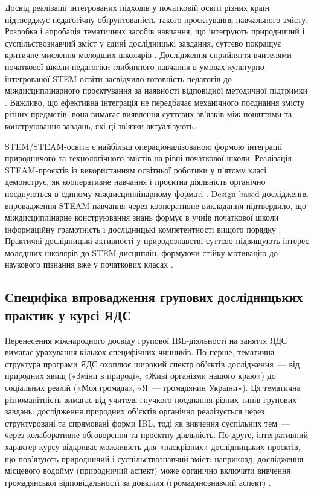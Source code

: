 \documentclass[a4paper,14pt]{extarticle}
\begin{document}
Досвід реалізації інтегрованих підходів у початковій освіті різних країн підтверджує педагогічну обґрунтованість такого проєктування навчального змісту. Розробка і апробація тематичних засобів навчання, що інтегрують природничий і суспільствознавчий зміст у єдині дослідницькі завдання, суттєво покращує критичне мислення молодших школярів \parencite{Sururuddin2026}. Дослідження сприйняття вчителями початкової школи педагогіки глибинного навчання в умовах культурно-інтегрованої STEM-освіти засвідчило готовність педагогів до міждисциплінарного проєктування за наявності відповідної методичної підтримки \parencite{Putri20251331}. Важливо, що ефективна інтеграція не передбачає механічного поєднання змісту різних предметів: вона вимагає виявлення суттєвих зв'язків між поняттями та конструювання завдань, які ці зв'язки актуалізують.

STEM/STEAM-освіта є найбільш операціоналізованою формою інтеграції природничого та технологічного змістів на рівні початкової школи. Реалізація STEAM-проєктів із використанням освітньої роботики у п'ятому класі демонструє, як кооперативне навчання і проєктна діяльність органічно поєднуються в єдиному міждисциплінарному форматі \parencite{Vicente20201}. Design-based дослідження впровадження STEAM-навчання через кооперативне викладання підтвердило, що міждисциплінарне конструювання знань формує в учнів початкової школи інформаційну грамотність і дослідницькі компетентності вищого порядку \parencite{Li2022}. Практичні дослідницькі активності у природознавстві суттєво підвищують інтерес молодших школярів до STEM-дисциплін, формуючи стійку мотивацію до наукового пізнання вже у початкових класах \parencite{Ribarić2025}.

\subsection{Специфіка впровадження групових дослідницьких практик у курсі ЯДС}

Перенесення міжнародного досвіду групової IBL-діяльності на заняття ЯДС вимагає урахування кількох специфічних чинників. По-перше, тематична структура програми ЯДС охоплює широкий спектр об'єктів дослідження~--- від природних явищ («Зміни в природі», «Живі організми нашого краю») до соціальних реалій («Моя громада», «Я~--- громадянин України»). Ця тематична різноманітність вимагає від учителя гнучкого поєднання різних типів групових завдань: дослідження природних об'єктів органічно реалізується через структуровані та спрямовані форми IBL, тоді як вивчення суспільних тем~--- через колаборативне обговорення та проєктну діяльність. По-друге, інтегративний характер курсу відкриває можливість для «наскрізних» дослідницьких проєктів, що пов'язують природничий і суспільствознавчий зміст: наприклад, дослідження місцевого водойму (природничий аспект) може органічно включати вивчення громадянської відповідальності за довкілля (громадянознавчий аспект) \parencite{Christodoulou2025969}.
\end{document}
